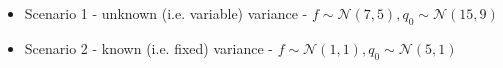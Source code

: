 \begin{itemize}
    \item Scenario 1 - unknown (i.e. variable) variance - $f \sim 
    \mathcal{N}(7, 5), q_0 \sim \mathcal{N}(15, 9)$
    
    \item Scenario 2 - known (i.e. fixed) variance - $f \sim \mathcal{N}(1, 1), q_0 \sim \mathcal{N}(5, 1)$
\end{itemize}

